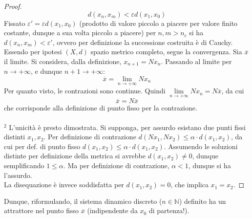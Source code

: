 \documentclass[10pt, oneside]{book}
\theoremstyle{plain}
\begin{document}
\begin{proof}
\[d(x_n, x_m) < \varepsilon d(x_1, x_0)\]
Fissato $\varepsilon' = \varepsilon d(x_1, x_0)$ (prodotto di valore piccolo a piacere per valore finito costante, dunque a sua volta piccolo a piacere) per $n, m > n_c$ si ha $d(x_n, x_m) < \varepsilon'$, ovvero per definizione la successione costruita è di Cauchy.
\\Essendo per ipotesi $(X,d)$ spazio metrico completo, segue la convergenza. Sia $\overline{x}$ il limite. Si considera, dalla definizione, $x_{n+1} = N x_n$. Passando al limite per $n \rightarrow +\infty$, e dunque $n+1 \rightarrow +\infty$: 
\[\overline{x} = \lim\limits_{n \rightarrow +\infty} N x_n\]
Per quanto visto, le contrazioni sono continue. Quindi $\displaystyle \lim\limits_{n \rightarrow +\infty} N x_n = N \overline{x}$, da cui
\[\overline{x} = N \overline{x}\]
che corrisponde alla definizione di punto fisso per la contrazione.
\\~\\$^2$ L'unicità è presto dimostrata. Si supponga, per assurdo esistano due punti fissi distinti $x_1, x_2$. Per definizione di contrazione $d(N x_1, N x_2) \leq \alpha \cdot d(x_1, x_2)$, da cui per def. di punto fisso $d(x_1, x_2) \leq \alpha \cdot d(x_1, x_2)$. Assumendo le soluzioni distinte per definizione della metrica si avrebbe $d(x_1, x_2) \neq 0$, dunque semplificando $1 \leq \alpha$. Ma per definizione di contrazione, $\alpha < 1$, dunque si ha l'assurdo.
\\La disequazione è invece soddisfatta per $d(x_1, x_2) = 0$, che implica $x_1 = x_2$.
\end{proof}
Dunque, riformulando, il sistema dinamico discreto ($n \in \mathbb{N}$) definito ha un attrattore nel punto fisso $\overline{x}$ (indipendente da $x_0$ di partenza!).
\end{document}
